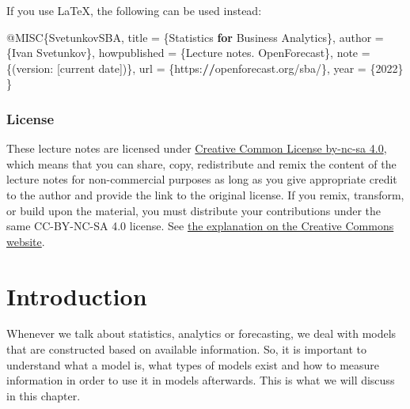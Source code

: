 \documentclass[
]{book}
\newenvironment{Shaded}{\begin{snugshade}}{\end{snugshade}}
\newcommand{\ControlFlowTok}[1]{\textcolor[rgb]{0.13,0.29,0.53}{\textbf{#1}}}
\newcommand{\DecValTok}[1]{\textcolor[rgb]{0.00,0.00,0.81}{#1}}
\newcommand{\ErrorTok}[1]{\textcolor[rgb]{0.64,0.00,0.00}{\textbf{#1}}}
\newcommand{\NormalTok}[1]{#1}
\newcommand{\OtherTok}[1]{\textcolor[rgb]{0.56,0.35,0.01}{#1}}
\newcommand{\SpecialCharTok}[1]{\textcolor[rgb]{0.00,0.00,0.00}{#1}}
\theoremstyle{definition}
\theoremstyle{definition}
\theoremstyle{definition}
\theoremstyle{definition}
\theoremstyle{remark}
\begin{document}
If you use LaTeX, the following can be used instead:

\begin{Shaded}
\begin{Highlighting}[]
\SpecialCharTok{@}\NormalTok{MISC\{SvetunkovSBA,}
\NormalTok{    title }\OtherTok{=}\NormalTok{ \{Statistics }\ControlFlowTok{for}\NormalTok{ Business Analytics\},}
\NormalTok{    author }\OtherTok{=}\NormalTok{ \{Ivan Svetunkov\},}
\NormalTok{    howpublished }\OtherTok{=}\NormalTok{ \{Lecture notes. OpenForecast\},}
\NormalTok{    note }\OtherTok{=}\NormalTok{ \{(version}\SpecialCharTok{:}\NormalTok{ [current date])\},}
\NormalTok{    url }\OtherTok{=}\NormalTok{ \{https}\SpecialCharTok{:}\ErrorTok{//}\NormalTok{openforecast.org}\SpecialCharTok{/}\NormalTok{sba}\SpecialCharTok{/}\NormalTok{\},}
\NormalTok{    year }\OtherTok{=}\NormalTok{ \{}\DecValTok{2022}\NormalTok{\}}
\NormalTok{\}}
\end{Highlighting}
\end{Shaded}

\hypertarget{license}{%
\subsection*{License}\label{license}}

These lecture notes are licensed under \href{https://creativecommons.org/licenses/by-nc-sa/4.0/}{Creative Common License by-nc-sa 4.0}, which means that you can share, copy, redistribute and remix the content of the lecture notes for non-commercial purposes as long as you give appropriate credit to the author and provide the link to the original license. If you remix, transform, or build upon the material, you must distribute your contributions under the same CC-BY-NC-SA 4.0 license. See \href{https://creativecommons.org/licenses/by-nc-sa/4.0/}{the explanation on the Creative Commons website}.

\hypertarget{intro}{%
\chapter{Introduction}\label{intro}}

Whenever we talk about statistics, analytics or forecasting, we deal with models that are constructed based on available information. So, it is important to understand what a model is, what types of models exist and how to measure information in order to use it in models afterwards. This is what we will discuss in this chapter.
\end{document}
